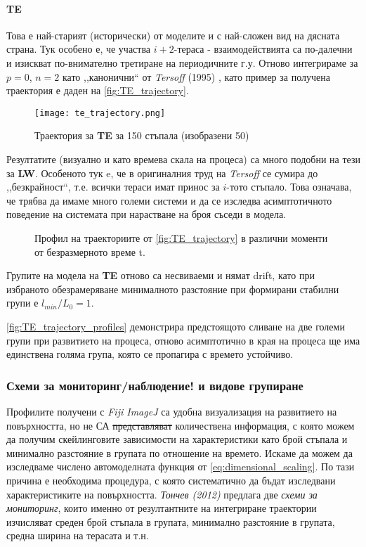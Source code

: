 \paragraph{TE} Това е най-старият (исторически) от моделите и с най-сложен вид на дясната страна. Тук особено е, че участва $i+2$-тераса - взаимодействията са по-далечни и изискват по-внимателно третиране на периодичните г.у. Отново интегрираме за $p = 0$, $n = 2$ като ,,канонични`` от \textit{Tersoff} (1995) \cite{Tersoff1995}, като пример за получена траектория е даден на \autoref{fig:TE_trajectory}.
\begin{figure}[htbp]
	\centering
	\texttt{[image: te\_trajectory.png]}
	\caption{Траектория за \textbf{TE} за 150 стъпала (изобразени 50)}
	\label{fig:TE_trajectory}
\end{figure}
Резултатите (визуално и като времева скала на процеса) са много подобни на тези за \textbf{LW}. Особеното тук e, че в оригиналния труд на \textit{Tersoff} се сумира до ,,безкрайност``, т.е. всички тераси имат принос за $i$-тото стъпало. Това означава, че трябва да имаме много големи системи и да се изследва асимптотичното поведение на системата при нарастване на броя съседи в модела.
\begin{figure}[hbpt]
    \centering
    \caption{Профил на траекториите от \autoref{fig:TE_trajectory} в различни моменти от безразмерното време t.}
    \label{fig:TE_trajectory_profiles}
\end{figure}
Групите на модела на \textbf{TE} отново са несвиваеми и нямат drift, като при избраното обезрамеряване минималното разстояние при формирани стабилни групи е $l_{min}/L_{0} = 1$. 

\autoref{fig:TE_trajectory_profiles} демонстрира предстоящото сливане на две големи групи при развитието на процеса, отново асимптотично в края на процеса ще има единствена голяма група, която се пропагира с времето устойчиво.

\subsubsection{Схеми за мониторинг/наблюдение! и видове групиране}
Профилите получени с \textit{Fiji ImageJ} са удобна визуализация на развитието на повърхността, но не СА \sout{представляват} количествена информация, с която можем да получим скейлинговите зависимости на характеристики като брой стъпала и минимално разстояние в групата по отношение на времето. Искаме да можем да изследваме числено автомоделната функция от \autoref{eq:dimensional_scaling}. По тази причина е необходима процедура, с която систематично да бъдат изследвани характеристиките на повърхността. \textit{Тончев (2012)} \cite{TonchevArxiv2012} предлага две \textit{схеми за мониторинг}, които именно от резултантните на интегриране траектории изчисляват среден брой стъпала в групата, минимално разстояние в групата, средна ширина на терасата и т.н. 

